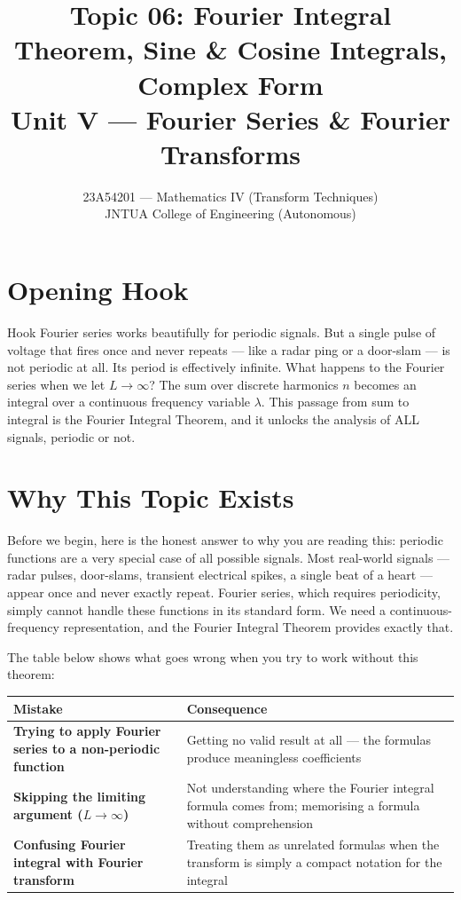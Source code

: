 \documentclass[12pt,a4paper]{article}
\title{Topic 06: Fourier Integral Theorem, Sine \& Cosine Integrals, Complex Form \\
\large Unit V --- Fourier Series \& Fourier Transforms}
\author{23A54201 --- Mathematics IV (Transform Techniques) \\
JNTUA College of Engineering (Autonomous)}
\date{}
\begin{document}
\maketitle
\tableofcontents
\newpage

\section{Opening Hook}

\begin{curiositybox}{Hook}
Fourier series works beautifully for periodic signals. But a single pulse of voltage that fires once and never repeats --- like a radar ping or a door-slam --- is not periodic at all. Its period is effectively infinite. What happens to the Fourier series when we let $L \to \infty$? The sum over discrete harmonics $n$ becomes an integral over a continuous frequency variable $\lambda$. This passage from sum to integral is the Fourier Integral Theorem, and it unlocks the analysis of ALL signals, periodic or not.
\end{curiositybox}

\section{Why This Topic Exists}

Before we begin, here is the honest answer to why you are reading this: periodic functions are a very special case of all possible signals. Most real-world signals --- radar pulses, door-slams, transient electrical spikes, a single beat of a heart --- appear once and never exactly repeat. Fourier series, which requires periodicity, simply cannot handle these functions in its standard form. We need a continuous-frequency representation, and the Fourier Integral Theorem provides exactly that.

The table below shows what goes wrong when you try to work without this theorem:

\begin{center}
\begin{tabular}{>{\bfseries}p{} p{}}
\toprule
\textbf{Mistake} & \textbf{Consequence} \\
\midrule
Trying to apply Fourier series to a non-periodic function & Getting no valid result at all --- the formulas produce meaningless coefficients \\
\midrule
Skipping the limiting argument ($L\to\infty$) & Not understanding where the Fourier integral formula comes from; memorising a formula without comprehension \\
\midrule
Confusing Fourier integral with Fourier transform & Treating them as unrelated formulas when the transform is simply a compact notation for the integral \\
\bottomrule
\end{tabular}
\end{center}
\end{document}
